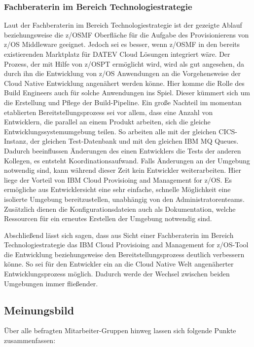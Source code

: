 \subsubsection{Fachberaterin im Bereich Technologiestrategie}
Laut der Fachberaterin im Bereich Technologiestrategie ist der gezeigte Ablauf beziehungsweise die z/OSMF Oberfläche für die Aufgabe des Provisionierens von z/OS Middleware geeignet.
Jedoch sei es besser, wenn z/OSMF in den bereits existierenden \glqq Marktplatz\grqq{} für DATEV Cloud Lösungen integriert wäre.
Der Prozess, der mit Hilfe von z/OSPT ermöglicht wird, wird als gut angesehen, da durch ihn die Entwicklung von z/OS Anwendungen an die Vorgehensweise der Cloud Native Entwicklung angenähert werden könne.
Hier komme die Rolle des Build Engineers auch für solche Anwendungen ins Spiel.
Dieser kümmert sich um die Erstellung und Pflege der Build-Pipeline.
Ein große Nachteil im momentan etablierten Bereitstellungsprozess sei vor allem,  dass eine Anzahl von Entwicklern, die parallel an einem Produkt arbeiten, sich die gleiche Entwicklungssystemumgebung teilen.
So arbeiten alle mit der gleichen CICS-Instanz, der gleichen Test-Datenbank und mit den gleichen IBM MQ Queues.
Dadurch beeinflussen Änderungen des einen Entwicklers die Tests der anderen Kollegen, es entsteht Koordinationsaufwand.
Falls Änderungen an der Umgebung notwendig sind, kann während dieser Zeit kein Entwickler weiterarbeiten.
Hier liege der Vorteil von \glqq IBM Cloud Provisioing and Management for z/OS\grqq.
Es ermögliche aus Entwicklersicht eine sehr einfache, schnelle Möglichkeit eine isolierte Umgebung bereitzustellen, unabhängig von den Administratorenteams.
Zusätzlich dienen die Konfigurationsdateien auch als Dokumentation, welche Ressourcen für ein erneutes Erstellen der Umgebung notwendig sind.

Abschließend lässt sich sagen, dass aus Sicht einer Fachberaterin im Bereich Technologiestrategie das \glqq IBM Cloud Provisioing and Management for z/OS\grqq-Tool die Entwicklung beziehungsweise den Bereitstellungsprozess deutlich verbessern könne.
So sei für den Entwickler ein an die Cloud Native Welt angenäherter Entwicklungsprozess möglich.
Dadurch werde der Wechsel zwischen beiden Umgebungen immer fließender.

\subsection{Meinungsbild}
Über alle befragten Mitarbeiter-Gruppen hinweg lassen sich folgende Punkte zusammenfassen:

